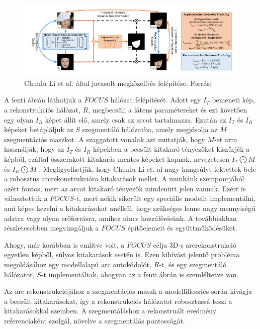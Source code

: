 \documentclass[12pt,a4]{article}
\begin{document}
 	\begin{figure}[h]	
 		\centering
 		\includegraphics[width=1\linewidth]{focus}
 		\caption{Chunlu Li et al. által javasolt megközelítés felépítése.
 			Forrás:\cite{focus}}
        \label{fig:focus}
 	\end{figure}
 	
 	A fenti ábrán láthatjuk a $FOCUS$ hálózat felépítését.
 	Adott egy $I_{T}$ bemeneti kép, a rekonstrukciós hálózat, $R$, megbecsüli a látens
 	paramétereket és ezt követően egy olyan $I_{R}$ képet állít elő, amely csak az
 	arcot tartalmazza. Ezután az $I_{T}$ és $I_{R}$ képeket betápláljuk az $S$ szegmentáló
 	hálózatba, amely megjósolja az $M$ szegmentációs maszkot. A szaggatott
 	vonalak azt mutatják, hogy $M$-et arra használják, hogy az $I_{T}$ és $I_{R}$ képekben
 	a becsült kitakaró tényezőket kiszűrjék a képből, ezáltal összerakott kitakarás mentes képeket
 	kapnak, nevezetesen $I_{T}\bigodot M$ és $I_{R}\bigodot M$ .
 	Megfigyelhetjük, hogy Chunlu Li et. al nagy hangsúlyt fektettek bele a
 	robosztus arcrekonstrukcióra kitakarások mellet. A munkánk szempontjából
 	azért fontos, mert az arcot kitakaró tényezők mindenütt jelen vannak. Ezért is választottuk
 	a $FOCUS$-t, mert nekik sikerült egy speciális modellt implementálni, ami
 	képes kezelni a kitakarásokat anélkül, hogy szükséges lenne nagy mennyiségű
 	adatra vagy olyan erőforrásra, amihez nincs hozzáférésünk.
 	A továbbiakban részletesebben megvizsgáljuk a $FOCUS$ építőelemeit és
 	együttműködésüket.
 	
 	Ahogy, már korábban is említve volt, a $FOCUS$ célja 3D-s
 	arcrekonstrukció egyetlen képből, súlyos kitakarások esetén is. Ezen kihívást
 	jelentő probléma megoldásához egy modellalapú arc autokódolót, $R$-t, és
 	egy szegmentáló hálózatot, $S$-t implementáltak, ahogyan az a fenti ábrán is
 	szemléltetve van.
 	
 	Az arc rekonstrukciójához a szegmentációs maszk a modellillesztés során
 	kivágja a becsült kitakarásokat, így a rekonstrukciós hálózatot robosztussá
 	teszi a kitakarásokkal szemben. A szegmentáláshoz a rekonstruált eredmény
 	referenciaként szolgál, növelve a szegmentálás pontosságát.
 	
\end{document}
